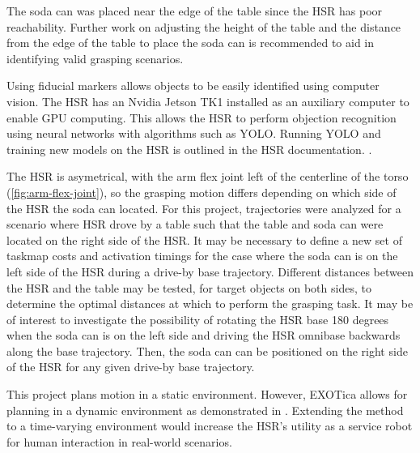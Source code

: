 \documentclass[12pt]{article}
\begin{document}
        \par The soda can was placed near the edge of the table since the HSR has poor reachability. Further work on adjusting the height of the table and the distance from the edge of the table to place the soda can is recommended to aid in identifying valid grasping scenarios.

        \par Using fiducial markers allows objects to be easily identified using computer vision. The HSR has an Nvidia Jetson TK1 installed as an auxiliary computer to enable GPU computing. This allows the HSR to perform objection recognition using neural networks with algorithms such as YOLO. Running YOLO and training new models on the HSR is outlined in the HSR documentation. \cite{noauthor_hsrb_manual_nodate}.

        \par The HSR is asymetrical, with the arm flex joint left of the centerline of the torso (\cref{fig:arm-flex-joint}), so the grasping motion differs depending on which side of the HSR the soda can located. For this project, trajectories were analyzed for a scenario where HSR drove by a table such that the table and soda can were located on the right side of the HSR. It may be necessary to define a new set of taskmap costs and activation timings for the case where the soda can is on the left side of the HSR during a drive-by base trajectory. Different distances between the HSR and the table may be tested, for target objects on both sides, to determine the optimal distances at which to perform the grasping task. It may be of interest to investigate the possibility of rotating the HSR base 180 degrees when the soda can is on the left side and driving the HSR omnibase backwards along the base trajectory. Then, the soda can can be positioned on the right side of the HSR for any given drive-by base trajectory.

        \par This project plans motion in a static environment. However, EXOTica allows for planning in a dynamic environment as demonstrated in \cite{yang_planning_2018}. Extending the method to a time-varying environment would increase the HSR's utility as a service robot for human interaction in real-world scenarios.
\end{document}
